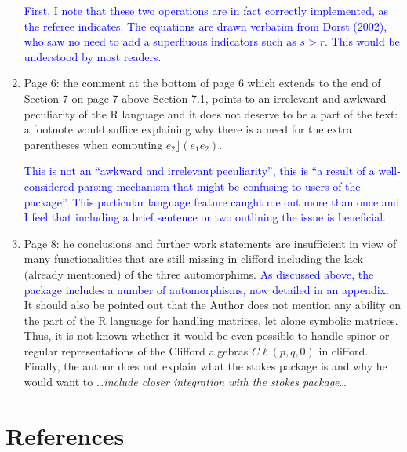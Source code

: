 \documentclass{article}
\newcommand{\cliff}[1]{\ensuremath{C\ell\left(#1\right)}}
\begin{document}
\begin{enumerate}
\textcolor{blue}{First, I note that these two operations are in fact
  correctly implemented, as the referee indicates.  The equations are
  drawn verbatim from Dorst (2002), who saw no need to add a
  superfluous indicators such as $s>r$. This would be understood by
  most readers.}

\item Page 6: the comment at the bottom of page 6 which extends to the
  end of Section 7 on page 7 above Section 7.1, points to an
  irrelevant and awkward peculiarity of the R language and it does not
  deserve to be a part of the text: a footnote would suffice
  explaining why there is a need for the extra parentheses when
  computing $e_2\rfloor (e_1e_2)$.

  \textcolor{blue}{This is not an ``awkward and irrelevant
    peculiarity'', this is ``a result of a well-considered parsing
    mechanism that might be confusing to users of the package''.  This
    particular language feature caught me out more than once and I
    feel that including a brief sentence or two outlining the issue is
    beneficial.}

    
\item Page 8: he conclusions and further work statements are
  insufficient in view of many functionalities that are still missing
  in clifford including the lack (already mentioned) of the three
  automorphims. \textcolor{blue}{As discussed above, the package
    includes a number of automorphisms, now detailed in an appendix.}
  It should also be pointed out that the Author does not mention any
  ability on the part of the R language for handling matrices, let
  alone symbolic matrices.  Thus, it is not known whether it would be
  even possible to handle spinor or regular representations of the
  Clifford algebras \cliff{p, q, 0} in clifford.  Finally, the author
  does not explain what the stokes package is and why he would want to
  \ldots{\em include closer integration with the stokes package}\ldots

\end{enumerate}

\section*{References}
\end{document}
